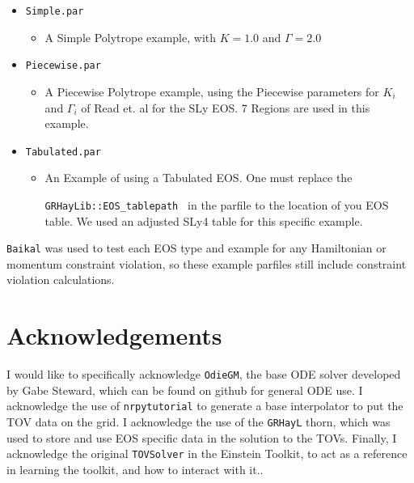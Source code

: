 \begin{itemize}
    \item {\tt Simple.par }
    \begin{itemize}
    \item A Simple Polytrope example, with $K=1.0$ and $\Gamma=2.0$
    \end{itemize}
    \item {\tt Piecewise.par }
    \begin{itemize}
    \item A Piecewise Polytrope example, using the Piecewise parameters for $K_i$ and $\Gamma_i$ of Read et. al for the SLy EOS.\cite{Read} 7 Regions are used in this example.
    \end{itemize}
    \item {\tt Tabulated.par }
    \begin{itemize}
    \item An Example of using a Tabulated EOS. One must replace the 
    
    {\tt GRHayLib::EOS\_tablepath } in the parfile to the location of you EOS table. We used an adjusted SLy4 table for this specific example.
    \end{itemize}
\end{itemize}

{\tt Baikal} was used to test each EOS type and example for any Hamiltonian or momentum constraint violation, so these example parfiles still include constraint violation calculations.

\section{Acknowledgements}

I would like to specifically acknowledge {\tt OdieGM}, the base ODE solver developed by Gabe Steward, which can be found on github for general ODE use. I acknowledge the use of {\tt nrpytutorial}\cite{NRpy} to generate a base interpolator to put the TOV data on the grid. I acknowledge the use of the {\tt GRHayL} thorn, which was used to store and use EOS specific data in the solution to the TOVs. Finally, I acknowledge the original {\tt TOVSolver} in the Einstein Toolkit, to act as a reference in learning the toolkit, and how to interact with it.\cite{Hawke}.

